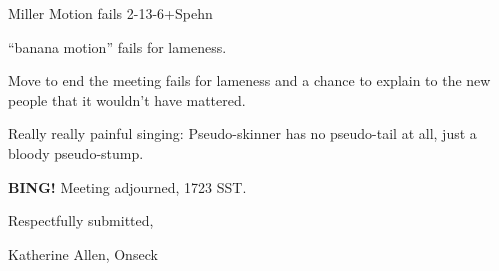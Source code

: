 \documentclass[10pt]{article}
\newcommand{\bing}{{\bf BING!} }
\begin{document}
Miller Motion fails 2-13-6+Spehn

``banana motion'' fails for lameness.

Move to end the meeting fails for lameness and a chance to explain to
the new people that it wouldn't have mattered.

Really really painful singing: 
Pseudo-skinner has no pseudo-tail at all, just a bloody pseudo-stump.

\bing
\noindent
Meeting adjourned, 1723 SST.

\vspace{18pt}

\centerline{Respectfully submitted,}
\centerline{Katherine Allen, Onseck}
\end{document}
